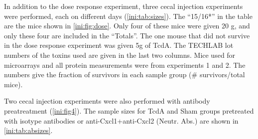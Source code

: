 \begin{table}[b!]
\centering
\begin{adjustwidth}{-1cm}{}
\end{adjustwidth}
\caption{Cecal injection experiments }
\label{ini:tab:sizes}
\end{table}

In addition to the dose response experiment, three cecal injection experiments were performed, each on
different days (\autoref{ini:tab:sizes}). The ``15/16*'' in the table are the mice shown in
\autoref{ini:fig:dose}. Only four of these mice were given 20 \textmugreek{}g, and
only these four are included in the ``Totals''. The one mouse that did not
survive in the dose response experiment was given 5\textmugreek{}g of TcdA.
The TECHLAB\textsuperscript{\textregistered{}} lot numbers 
of the toxins used are given in the last two columns. Mice used for microarrays
and all protein measurements were from experiments 1 and 2. The numbers
give the fraction of survivors in each sample group (\# survivors/total mice). 

Two cecal injection experiments were also performed with antibody 
preatreatment (\autoref{ini:fig4}). The sample sizes for TcdA and Sham
groups pretreated with isotype antibodies or anti-Cxcl1+anti-Cxcl2 (Neutr. Abs.) 
are shown in \autoref{ini:tab:absizes}.

